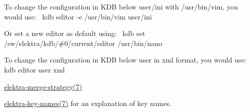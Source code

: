 To change the configuration in K\+DB below {\ttfamily user/ini} with {\ttfamily /usr/bin/vim}, you would use\+:~\newline
 {\ttfamily kdb editor -\/e /usr/bin/vim user/ini}

Or set a new editor as default using\+:~\newline
 {\ttfamily kdb set /sw/elektra/kdb/\#0/current/editor /usr/bin/nano}

To change the configuration in K\+DB below {\ttfamily user} in xml format, you would use\+:~\newline
 {\ttfamily kdb editor user xml}


\begin{DoxyItemize}
\item \mbox{\hyperlink{doc_help_elektra-merge-strategy_md}{elektra-\/merge-\/strategy(7)}}
\item \mbox{\hyperlink{doc_help_elektra-key-names_md}{elektra-\/key-\/names(7)}} for an explanation of key names. 
\end{DoxyItemize}